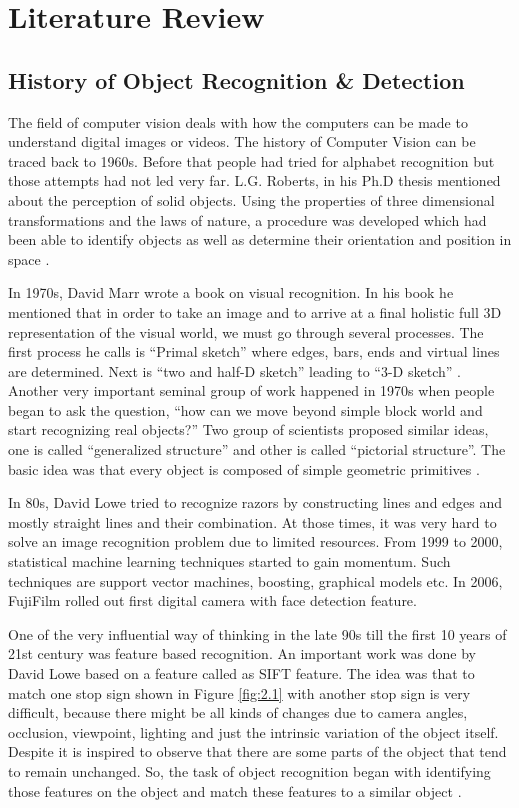 \chapter{Literature Review}
\label{Chapter 2}

\section{History of Object Recognition \& Detection}

The field of computer vision deals with how the computers can be made to understand digital images or videos. 
The history of Computer Vision can be traced back to 1960s. Before that people had tried for alphabet recognition 
but those attempts had not led very far. L.G. Roberts, in his Ph.D thesis mentioned about the perception 
of solid objects. Using the properties of three dimensional transformations and the laws of nature, a procedure 
was developed which had been able to identify objects as well as determine their orientation and position in space \cite{chap_2_article:1}. 

In 1970s, David Marr wrote a book on visual recognition. In his book he mentioned that in order to take an 
image and to arrive at a final holistic full 3D representation of the visual world, we must go through 
several processes. The first process he calls is “Primal sketch” where edges, bars, ends and virtual lines 
are determined. Next is “two and half-D sketch” leading to “3-D sketch”  \cite{chap_2_article:2}. Another very important seminal 
group of work happened in 1970s when people began to ask the question, “how can we move beyond simple block 
world and start recognizing real objects?” Two group of scientists proposed similar ideas, one 
is called “generalized structure” and other is called “pictorial structure”. The basic idea was that 
every object is composed of simple geometric primitives \cite{chap_2_article:3}. 

In 80s, David Lowe tried to recognize razors by constructing lines and edges and mostly straight lines 
and their combination. At those times, it was very hard to solve an image recognition problem due to 
limited resources. From 1999 to 2000, statistical machine learning techniques started to gain momentum. Such 
techniques are support vector machines, boosting, graphical models etc. In 2006, FujiFilm rolled out first 
digital camera with face detection feature.

One of the very influential way of thinking in the late 90s till the first 10 years of 21st century was feature 
based recognition. An important work was done by David Lowe based on a feature called as SIFT feature. The idea 
was that to match one stop sign shown in Figure \ref{fig:2.1} with another stop sign is very difficult, because there might 
be all kinds of changes due to camera angles, occlusion, viewpoint, lighting and just the intrinsic variation of 
the object itself. Despite it is inspired to observe that there are some parts of the object that tend to remain 
unchanged. So, the task of object recognition began with identifying those features on the object and match these 
features to a similar object \cite{chap_2_article:4}.

